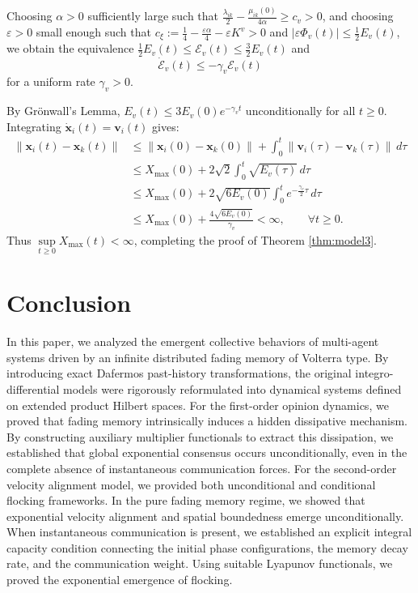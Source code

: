 \documentclass[11pt]{amsart}
\numberwithin{equation}{section}
\begin{document}
Choosing $\alpha > 0$ sufficiently large such that $\frac{\lambda_{ik}}{2}-\frac{\mu_{ik}(0)}{4\alpha} \ge c_v > 0$, and choosing $\varepsilon > 0$ small enough such that $c_\xi := \frac14-\frac{\varepsilon\alpha}{4}-\varepsilon K^v > 0$ and $|\varepsilon\Phi_v(t)| \le \frac12 E_v(t)$, we obtain the equivalence $\frac12 E_v(t) \le \mathcal{E}_v(t) \le \frac32 E_v(t)$ and
\begin{equation*}
\dot{\mathcal{E}}_v(t) \le -\gamma_v \mathcal{E}_v(t)
\end{equation*}
for a uniform rate $\gamma_v > 0$.

By Gr\"onwall's Lemma, $E_v(t) \le 3 E_v(0) e^{-\gamma_v t}$ unconditionally for all $t \ge 0$. Integrating $\dot{\boldsymbol{x}}_i(t) = \boldsymbol{v}_i(t)$ gives:
\begin{align*}
\|\boldsymbol{x}_i(t)-\boldsymbol{x}_k(t)\| &\le \|\boldsymbol{x}_i(0)-\boldsymbol{x}_k(0)\| + \int_0^t \|\boldsymbol{v}_i(\tau)-\boldsymbol{v}_k(\tau)\|\,d\tau \\
&\le X_{\max}(0) + 2\sqrt{2}\int_0^t \sqrt{E_v(\tau)}\,d\tau \\
&\le X_{\max}(0) + 2\sqrt{6E_v(0)}\int_0^t e^{-\frac{\gamma_v}{2} \tau}\,d\tau \\
&\le X_{\max}(0) + \frac{4\sqrt{6E_v(0)}}{\gamma_v} < \infty, \qquad \forall t \ge 0.
\end{align*}
Thus $\sup\limits_{t\ge0} X_{\max}(t) < \infty$, completing the proof of Theorem \ref{thm:model3}.

\section{Conclusion}\label{sec:conclusion}

In this paper, we analyzed the emergent collective behaviors of multi-agent systems driven by an infinite distributed fading memory of Volterra type. By introducing exact Dafermos past-history transformations, the original integro-differential models were rigorously reformulated into dynamical systems defined on extended product Hilbert spaces. For the first-order opinion dynamics, we proved that fading memory intrinsically induces a hidden dissipative mechanism. By constructing auxiliary multiplier functionals to extract this dissipation, we established that global exponential consensus occurs unconditionally, even in the complete absence of instantaneous communication forces. For the second-order velocity alignment model, we provided both unconditional and conditional flocking frameworks. In the pure fading memory regime, we showed that exponential velocity alignment and spatial boundedness emerge unconditionally. When instantaneous communication is present, we established an explicit integral capacity condition connecting the initial phase configurations, the memory decay rate, and the communication weight. Using suitable Lyapunov functionals, we proved the exponential emergence of flocking.
\end{document}
